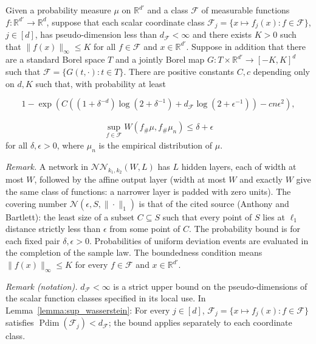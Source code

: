 \begin{lemma}\label{lemma:sup_wasserstein}
Given a probability measure $\mu$ on $\mathbb R^{d'}$ and a class $\mathcal F$ of measurable functions $f:\mathbb R^{d'}\rightarrow\mathbb R^d$, suppose that each scalar coordinate class $\mathcal F_j=\{x\mapsto f_j(x):f\in\mathcal F\}$, $j\in[d]$, has pseudo-dimension less than $d_{\mathcal F}<\infty$ and there exists $K>0$ such that $\|f(x)\|_\infty\leqslant K$ for all $f\in\mathcal F$ and $x\in\mathbb R^{d'}$. Suppose in addition that there are a standard Borel space $T$ and a jointly Borel map $G:T\times\mathbb R^{d'}\rightarrow[-K,K]^d$ such that $\mathcal F=\{G(t,\cdot):t\in T\}$. There are positive constants $C,c$ depending only on $d,K$ such that, with probability at least

\[
1-\exp\left(C\left((1+\delta^{-d})\log(2+\delta^{-1})+d_{\mathcal F}\log(2+\epsilon^{-1})\right)-cn\epsilon^2\right),
\]

\begin{align*}
\sup_{f\in\mathcal F}W(f_{\#}\mu,f_{\#}\mu_n)\leqslant\delta+\epsilon
\end{align*}
for all $\delta,\epsilon>0$, where $\mu_n$ is the empirical distribution of $\mu$. 
\end{lemma}

\noindent\textit{Remark.} A network in $\mathcal{NN}_{k_1,k_2}(W,L)$ has $L$ hidden layers, each of width at most $W$, followed by the affine output layer (width at most $W$ and exactly $W$ give the same class of functions: a narrower layer is padded with zero units). The covering number $\mathcal{N}(\epsilon,S,\|\cdot\|_1)$ is that of the cited source (Anthony and Bartlett): the least size of a subset $C\subseteq S$ such that every point of $S$ lies at $\ell_1$ distance strictly less than $\epsilon$ from some point of $C$. The probability bound is for each fixed pair $\delta,\epsilon>0$. Probabilities of uniform deviation events are evaluated in the completion of the sample law. The boundedness condition means $\|f(x)\|_{\infty}\leqslant K$ for every $f\in\mathcal{F}$ and $x\in\mathbb{R}^{d'}$.

\noindent\textit{Remark (notation).} $d_{\mathcal F}<\infty$ is a strict upper bound on the pseudo-dimensions of the scalar function classes specified in its local use. In Lemma~\ref{lemma:sup_wasserstein}: For every $j\in[d]$, $\mathcal F_j=\{x\mapsto f_j(x):f\in\mathcal F\}$ satisfies $\operatorname{Pdim}(\mathcal F_j)<d_{\mathcal F}$; the bound applies separately to each coordinate class.


